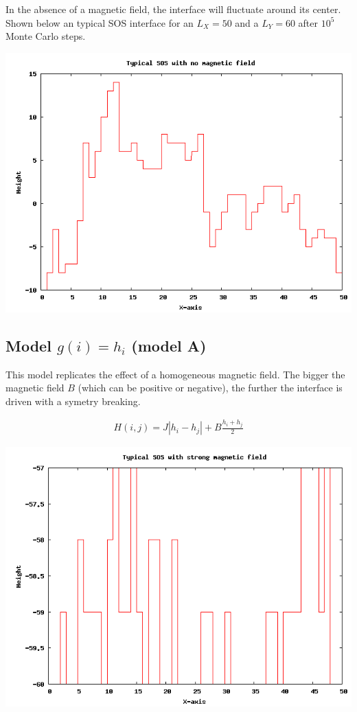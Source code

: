 In the absence of a magnetic field, the interface will fluctuate around its center. Shown below an typical SOS interface for an $L_X=50$ and a $L_Y=60$ after $10^5$ Monte Carlo steps.

\includegraphics{tm/nomag.png}


\subsection{Model $g(i) = h_i$ (model A)}

This model replicates the effect of a homogeneous magnetic field. The bigger the magnetic field $B$ (which can be positive or negative), the further the interface is driven with a symetry breaking. 

\begin{align}
  H(i,j) = J |h_i-h_j| + B \frac{h_i + h_j}{2}
\end{align}

\includegraphics{tm/normal.png}

